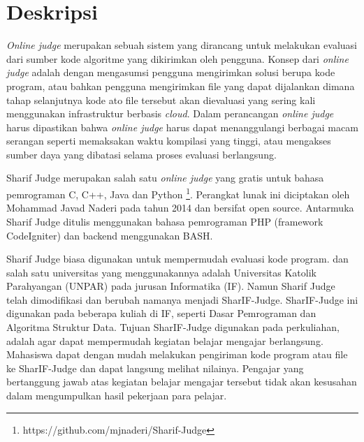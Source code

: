 \documentclass[a4paper,twoside]{article}
\newcommand{\oj}{\textit{online judge }}
\begin{document}
\title{\@judultopik}
\author{\nama \textendash \@npm} 

\newcommand{\nama}{Edwin Pranajaya}
\newcommand{\@npm}{2017730027}
\newcommand{\@judultopik}{Dukungan Bahasa JavaScript pada SharIF Judge} %
\newcommand{\jumpemb}{1} %
\newcommand{\tanggal}{22/02/2022}


\maketitle


\section{Deskripsi}

\textit{Online judge} merupakan sebuah sistem yang dirancang untuk melakukan evaluasi dari sumber kode algoritme yang dikirimkan oleh pengguna. Konsep dari \oj adalah dengan mengasumsi pengguna mengirimkan solusi berupa kode program, atau bahkan pengguna mengirimkan file yang dapat dijalankan dimana tahap selanjutnya kode ato file tersebut akan dievaluasi yang sering kali menggunakan infrastruktur berbasis \textit{cloud}. Dalam perancangan \oj harus dipastikan bahwa \oj harus dapat menanggulangi berbagai macam serangan seperti memaksakan waktu kompilasi yang tinggi, atau mengakses sumber daya yang dibatasi selama proses evaluasi berlangsung.

Sharif Judge merupakan salah satu \oj yang gratis untuk bahasa pemrograman C, C++, Java dan Python \footnote{https://github.com/mjnaderi/Sharif-Judge}. Perangkat lunak ini diciptakan oleh Mohammad Javad Naderi pada tahun 2014 dan bersifat open source. Antarmuka Sharif Judge ditulis menggunakan bahasa pemrograman PHP (framework CodeIgniter) dan backend menggunakan BASH.

Sharif Judge biasa digunakan untuk mempermudah evaluasi kode program. dan salah satu universitas yang menggunakannya adalah Universitas Katolik Parahyangan (UNPAR) pada jurusan Informatika (IF). Namun Sharif Judge telah dimodifikasi dan berubah namanya menjadi SharIF-Judge. SharIF-Judge ini digunakan pada beberapa kuliah di IF, seperti Dasar Pemrograman dan Algoritma Struktur Data. Tujuan SharIF-Judge digunakan pada perkuliahan, adalah agar dapat mempermudah kegiatan belajar mengajar berlangsung. Mahasiswa dapat dengan mudah melakukan pengiriman kode program atau file ke SharIF-Judge dan dapat langsung melihat nilainya. Pengajar yang bertanggung jawab atas kegiatan belajar mengajar tersebut tidak akan kesusahan dalam mengumpulkan hasil pekerjaan para pelajar. 
\end{document}
